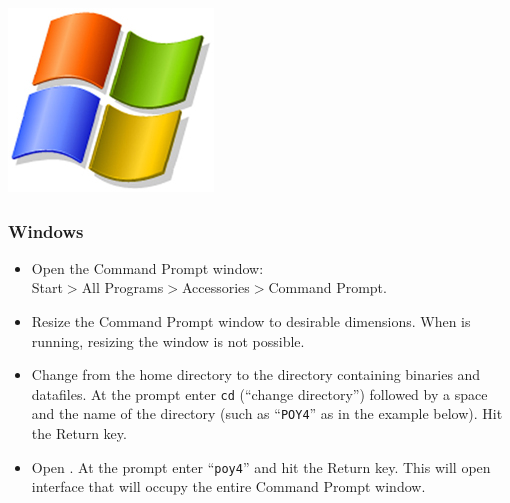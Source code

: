 \begin{flushleft}
	\begin{minipage}[c]{0.075\textwidth}
	   	\includegraphics[width=\textwidth]{figures/figLogoWindows.jpg}
	\end{minipage}%
	\quad
	\begin{minipage}[t]{0.89\textwidth}
		\subsubsection{Windows}
	\end{minipage}
			\begin{itemize}
				\item {Open the Command Prompt window: \\
				Start$>$All Programs$>$Accessories$>$Command Prompt.}
				\item {Resize the Command Prompt window to desirable dimensions.
				When \poy is running, resizing the window is not possible.}
				\item{Change from the home directory to the directory containing
				\poy binaries and datafiles. At the prompt enter \texttt{cd}
				(``change directory'') followed by a space and the name of the directory
				(such as ``\texttt{POY4}'' as in the example below). Hit the Return key.}
				\item{Open \poy. At the prompt enter ``\texttt{poy4}'' and
				hit the Return key. This will open \poy interface that will occupy the
				entire Command Prompt window.}
			\end{itemize}


\end{flushleft}
